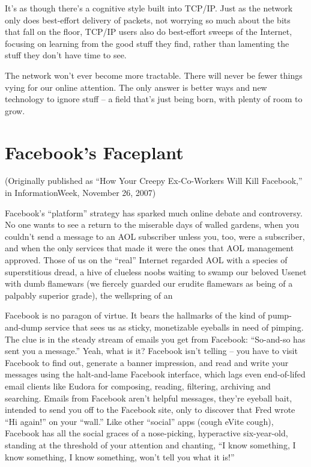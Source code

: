 It's as though there's a cognitive style built into TCP/IP. Just as
the network only does best-effort delivery of packets, not worrying
so much about the bits that fall on the floor, TCP/IP users also do
best-effort sweeps of the Internet, focusing on learning from the
good stuff they find, rather than lamenting the stuff they don't
have time to see.

The network won't ever become more tractable. There will never be
fewer things vying for our online attention. The only answer is
better ways and new technology to ignore stuff -- a field that's
just being born, with plenty of room to grow.

\section{Facebook's Faceplant}

(Originally published as ``How Your Creepy Ex-Co-Workers Will Kill
Facebook,'' in InformationWeek, November 26, 2007)

Facebook's ``platform'' strategy has sparked much online debate and
controversy. No one wants to see a return to the miserable days of
walled gardens, when you couldn't send a message to an AOL
subscriber unless you, too, were a subscriber, and when the only
services that made it were the ones that AOL management approved.
Those of us on the ``real'' Internet regarded AOL with a species of
superstitious dread, a hive of clueless noobs waiting to swamp our
beloved Usenet with dumb flamewars (we fiercely guarded our erudite
flamewars as being of a palpably superior grade), the wellspring of
an

Facebook is no paragon of virtue. It bears the hallmarks of the
kind of pump-and-dump service that sees us as sticky, monetizable
eyeballs in need of pimping. The clue is in the steady stream of
emails you get from Facebook: ``So-and-so has sent you a message.''
Yeah, what is it? Facebook isn't telling -- you have to visit
Facebook to find out, generate a banner impression, and read and
write your messages using the halt-and-lame Facebook interface,
which lags even end-of-lifed email clients like Eudora for
composing, reading, filtering, archiving and searching. Emails from
Facebook aren't helpful messages, they're eyeball bait, intended to
send you off to the Facebook site, only to discover that Fred wrote
``Hi again!'' on your ``wall.'' Like other ``social'' apps (cough eVite
cough), Facebook has all the social graces of a nose-picking,
hyperactive six-year-old, standing at the threshold of your
attention and chanting, ``I know something, I know something, I know
something, won't tell you what it is!''

